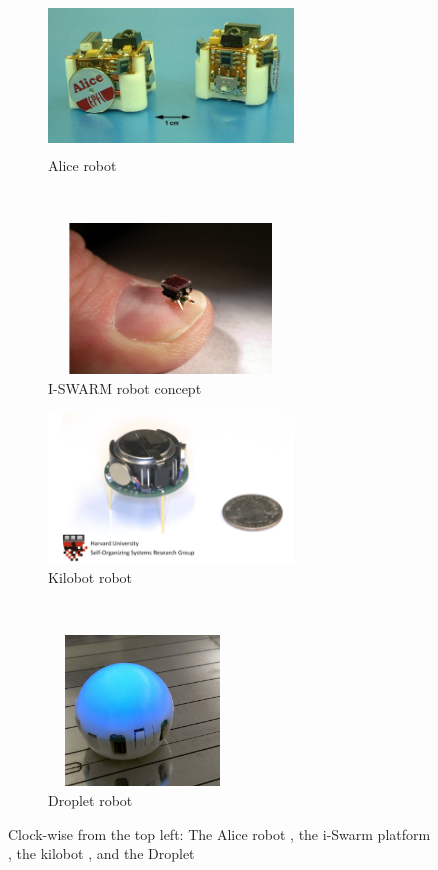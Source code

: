 \documentclass[Main.tex]{subfiles}
\begin{document}
\begin{figure}[!ht]
\centering\begin{subfigure}{.5\textwidth}
\centering\includegraphics[height=4cm,width=6.5cm]{assets/alicerobot.png}
\caption{Alice robot}
\end{subfigure}~
\centering\begin{subfigure}{.5\textwidth}
\centering\includegraphics[height=4cm,width=6.5cm]{assets/iswarm.png}
\caption{I-SWARM robot concept}
\end{subfigure}\vspace{1cm}
\centering\begin{subfigure}{.5\textwidth}
\centering\includegraphics[height=4cm,width=6.5cm]{assets/kilobotrobot.png}
\caption{Kilobot robot}
\end{subfigure}~
\centering\begin{subfigure}{.5\textwidth}
\centering\includegraphics[height=4cm,width=5cm]{assets/dropletrobot.png}
\caption{Droplet robot}
\end{subfigure}
\caption{Clock-wise from the top left: The Alice robot \cite{caprari2005mobile}\label{fig:swarmbots}, the i-Swarm platform \cite{Seyfried2005}, the kilobot \cite{Rubenstein2012}, and the Droplet \cite{farrow14}}
\end{figure}
\end{document}

